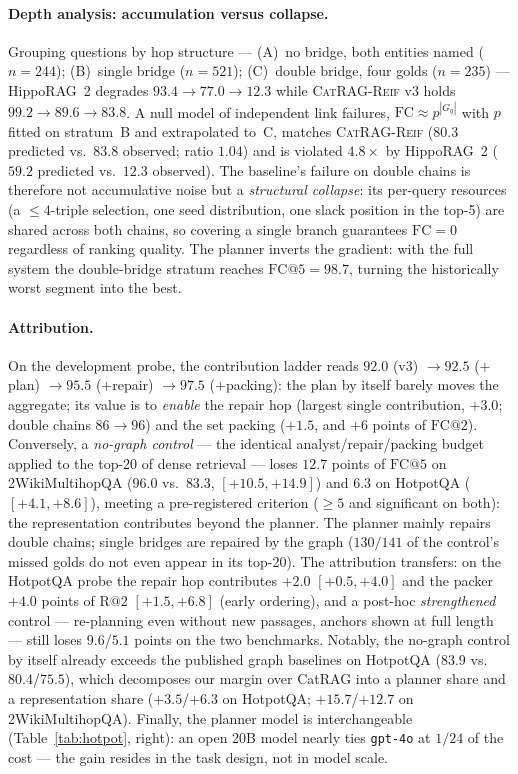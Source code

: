 \documentclass[11pt,a4paper]{article}
\newcommand{\sys}{\textsc{CatRAG-Reif}}
\newcommand{\hippo}{HippoRAG~2}
\begin{document}
\paragraph{Depth analysis: accumulation versus collapse.} Grouping questions
by hop structure --- (A)~no bridge, both entities named ($n{=}244$);
(B)~single bridge ($n{=}521$); (C)~double bridge, four golds ($n{=}235$) ---
\hippo{} degrades $93.4\to77.0\to12.3$ while \sys{} v3 holds
$99.2\to89.6\to83.8$. A null model of independent link failures,
$\mathrm{FC}\approx p^{|G_q|}$ with $p$ fitted on stratum~B and extrapolated
to~C, matches \sys{} ($80.3$ predicted vs.\ $83.8$ observed; ratio $1.04$)
and is violated $4.8\times$ by \hippo{} ($59.2$ predicted vs.\ $12.3$
observed). The baseline's failure on double chains is therefore not
accumulative noise but a \emph{structural collapse}: its per-query resources
(a $\le 4$-triple selection, one seed distribution, one slack position in
the top-5) are shared across both chains, so covering a single branch
guarantees $\mathrm{FC}=0$ regardless of ranking quality. The planner
inverts the gradient: with the full system the double-bridge stratum reaches
$\mathrm{FC@}5=98.7$, turning the historically worst segment into the best.

\paragraph{Attribution.} On the development probe, the contribution ladder
reads $92.0$ (v3) $\to 92.5$ ($+$plan) $\to 95.5$ ($+$repair)
$\to 97.5$ ($+$packing): the plan by itself barely moves the aggregate; its
value is to \emph{enable} the repair hop (largest single contribution,
$+3.0$; double chains $86\to96$) and the set packing ($+1.5$, and $+6$
points of $\mathrm{FC@}2$). Conversely, a \emph{no-graph control} --- the
identical analyst/repair/packing budget applied to the top-20 of dense
retrieval --- loses $12.7$ points of $\mathrm{FC@}5$ on 2WikiMultihopQA
($96.0$ vs.\ $83.3$, $[+10.5,+14.9]$) and $6.3$ on HotpotQA
($[+4.1,+8.6]$), meeting a pre-registered criterion ($\ge5$ and significant
on both): the representation contributes beyond the planner. The planner
mainly repairs double chains; single bridges are repaired by the graph
($130/141$ of the control's missed golds do not even appear in its top-20).
The attribution transfers: on the HotpotQA probe the repair hop contributes
$+2.0$ $[+0.5,+4.0]$ and the packer $+4.0$ points of $\mathrm{R@}2$
$[+1.5,+6.8]$ (early ordering), and a post-hoc \emph{strengthened} control
--- re-planning even without new passages, anchors shown at full length ---
still loses $9.6$/$5.1$ points on the two benchmarks. Notably, the no-graph
control by itself already exceeds the published graph baselines on HotpotQA
($83.9$ vs.\ $80.4$/$75.5$), which decomposes our margin over CatRAG into a
planner share and a representation share ($+3.5$/$+6.3$ on HotpotQA;
$+15.7$/$+12.7$ on 2WikiMultihopQA).
Finally, the planner model is interchangeable
(Table~\ref{tab:hotpot}, right): an open 20B model nearly ties
\texttt{gpt-4o} at $1/24$ of the cost --- the gain resides in the task
design, not in model scale.
\end{document}
